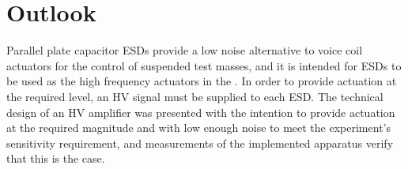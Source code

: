 % 

\section{Outlook}
Parallel plate capacitor \glspl{ESD} provide a low noise alternative to voice coil actuators for the control of suspended test masses, and it is intended for \glspl{ESD} to be used as the high frequency actuators in the \SSMEXPT{}. In order to provide actuation at the required level, an \gls{HV} signal must be supplied to each \gls{ESD}. The technical design of an \gls{HV} amplifier was presented with the intention to provide actuation at the required magnitude and with low enough noise to meet the experiment's sensitivity requirement, and measurements of the implemented apparatus verify that this is the case.